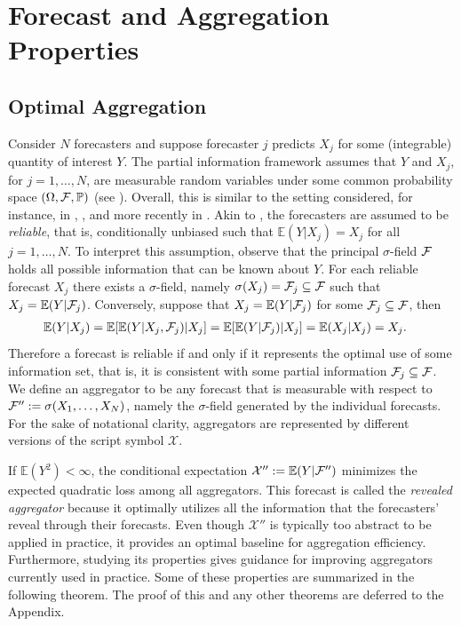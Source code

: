 \documentclass[11pt]{article}
\renewcommand{\P}{\mathbb{P}}
\newcommand{\E}{\mathbb{E}}
\theoremstyle{definition}
\theoremstyle{definition}
\def\F{{\cal F}}
\def\P{{\mathbb P}}
\def\E{{\mathbb E}}
\begin{document}
\section{Forecast and Aggregation Properties} \label{propertiesS}
\subsection{Optimal Aggregation}


Consider $N$ forecasters and suppose forecaster $j$ predicts $X_j$ for
some (integrable) quantity of interest $Y$.  The partial information
framework assumes that $Y$ and $X_j$, for $j = 1, \dots, N$, are
measurable random variables under some common probability space
$(\Omega, \F , \P)$ (see \citealt{satopaamodeling}). Overall, this is similar to the setting
considered, for instance,
in \cite{degroot1981assessing}, \cite{murphy1987general}, and more
recently in \cite{Ranjan08}. Akin to \cite{Ranjan08}, the forecasters
are assumed to be \textit{reliable}, that is, conditionally unbiased
such that $\E(Y | X_j) = X_j$ for all $j = 1, \dots, N$.  To interpret
this assumption, observe that the principal $\sigma$-field $\F$ holds
all possible information that can be known about $Y$. For each
reliable forecast $X_j$ there exists a $\sigma$-field, namely
$\sigma(X_j) = \F_j \subseteq \F$ such that $X_j
= \E(Y|\F_j)$. Conversely, suppose that $X_j = \E(Y|\F_j)$ for some
$\F_j \subseteq \F$, then
\begin{align*}
\E(Y | X_j) &= \E[\E(Y|X_j,\F_j)|X_j] = \E[\E(Y|\F_j)|X_j] = \E(X_j|X_j) = X_j.
\end{align*}
Therefore a forecast is reliable if and only if it represents the optimal use of some information set, that is, it is consistent with some partial information $\F_j \subseteq \F$.
We define an aggregator  to be any forecast that is measurable with respect to $\F'' := \sigma(X_1, \dots, X_N)$, namely the $\sigma$-field generated by the individual forecasts. For the sake of notational clarity, aggregators are represented by different versions of the script symbol $\mathcal{X}$. 



If $\E\left(Y^2\right) < \infty$, the conditional expectation
$\mathcal{X}'' := \E(Y | \F'')$ minimizes the expected quadratic loss
among all aggregators. This forecast is called the \textit{revealed
aggregator} because it optimally utilizes all the information that the
forecasters' reveal through their forecasts. Even though
$\mathcal{X}'' $ is typically too abstract to be applied in practice,
it provides an optimal baseline for aggregation
efficiency. Furthermore, studying its properties gives guidance for
improving aggregators currently used in practice. Some of these
properties are summarized in the following theorem. The proof of this
and any other theorems are deferred to the Appendix.
\end{document}
